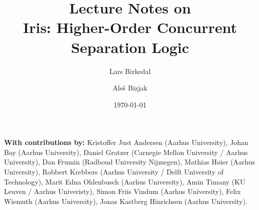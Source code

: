 \documentclass{article}
\title{\vfill Lecture Notes on\\ Iris: Higher-Order Concurrent Separation Logic}
\author{Lars Birkedal}
\author{Ale\v{s} Bizjak}
\affil{Aarhus University 
  \href{mailto:birkedal@cs.au.dk;abizjak@cs.au.dk}{\{birkedal,abizjak\}@cs.au.dk}}
\date{\today\vfill}
\begin{document}
\maketitle
\thispagestyle{empty}

\begin{minipage}{\textwidth-2cm}
  \textbf{With contributions by:}
  Kristoffer Just Andersen (Aarhus University),
  Johan Bay (Aarhus University),
  Daniel Gratzer (Carnegie Mellon University / Aarhus University),
  Dan Frumin (Radboud University Nijmegen),
  Mathias H{\o}ier (Aarhus University),
  Robbert Krebbers (Aarhus University / Delft University of Technology),
  Marit Edna Ohlenbusch (Aarhus University),
  Amin Timany (KU Leuven / Aarhus Univeristy),
  Simon Friis Vindum (Aarhus University),
  Felix Wiemuth (Aarhus University),
  Jonas Kastberg Hinrichsen (Aarhus University).
\end{minipage}

\newpage

\pagestyle{empty}
\setcounter{tocdepth}{2}
\tableofcontents

\newpage

\pagestyle{plain}
\setcounter{page}{1}


\newpage








































\appendix


\end{document}
